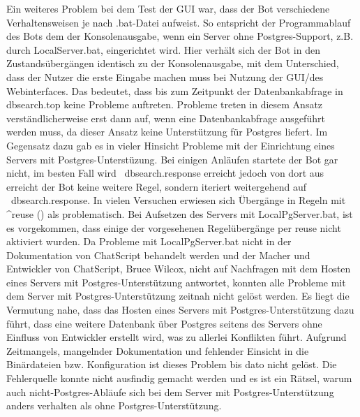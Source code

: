 Ein weiteres Problem bei dem Test der GUI war, dass der Bot verschiedene Verhaltensweisen je nach .bat-Datei aufweist. So entspricht der Programmablauf des Bots dem der Konsolenausgabe, wenn ein Server ohne Postgres-Support, z.B. durch LocalServer.bat, eingerichtet wird. Hier verhält sich der Bot in den Zustandsübergängen identisch zu der Konsolenausgabe, mit dem Unterschied, dass der Nutzer die erste Eingabe machen muss bei Nutzung der GUI/des Webinterfaces. Das bedeutet, dass bis zum Zeitpunkt der Datenbankabfrage in dbsearch.top keine Probleme auftreten. Probleme treten in diesem Ansatz verständlicherweise erst dann auf, wenn eine Datenbankabfrage ausgeführt werden muss, da dieser Ansatz keine Unterstützung für Postgres liefert. 
Im Gegensatz dazu gab es in vieler Hinsicht Probleme mit der Einrichtung eines Servers mit Postgres-Unterstüzung. Bei einigen Anläufen startete der Bot gar nicht, im besten Fall wird ~dbsearch.response erreicht jedoch von dort aus erreicht der Bot keine weitere Regel, sondern iteriert weitergehend auf ~dbsearch.response. In vielen Versuchen erwiesen sich Übergänge in Regeln mit ^reuse () als problematisch. Bei Aufsetzen des Servers mit LocalPgServer.bat, ist es vorgekommen, dass einige der vorgesehenen Regelübergänge per reuse nicht aktiviert wurden. 
Da Probleme mit LocalPgServer.bat nicht in der Dokumentation von ChatScript behandelt werden und der Macher und Entwickler von ChatScript, Bruce Wilcox, nicht auf Nachfragen mit dem Hosten eines Servers mit Postgres-Unterstützung antwortet, konnten alle Probleme mit dem Server mit Postgres-Unterstützung zeitnah nicht gelöst werden. Es liegt die Vermutung nahe, dass das Hosten eines Servers mit Postgres-Unterstützung dazu führt, dass eine weitere Datenbank über Postgres seitens des Servers ohne Einfluss von Entwickler erstellt wird, was zu allerlei Konflikten führt. Aufgrund Zeitmangels, mangelnder Dokumentation und fehlender Einsicht in die Binärdateien bzw. Konfiguration ist dieses Problem bis dato nicht gelöst. Die Fehlerquelle konnte nicht ausfindig gemacht werden und es ist ein Rätsel, warum auch nicht-Postgres-Abläufe sich bei dem Server mit Postgres-Unterstützung anders verhalten als ohne Postgres-Unterstützung. 
